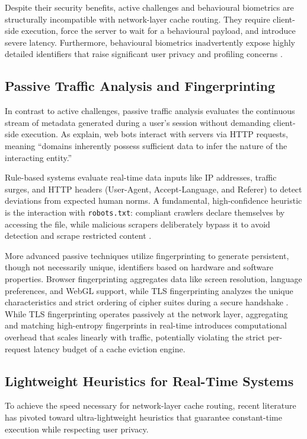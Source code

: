 Despite their security benefits, active challenges and behavioural biometrics are structurally incompatible with network-layer cache routing. They require client-side execution, force the server to wait for a behavioural payload, and introduce severe latency. Furthermore, behavioural biometrics inadvertently expose highly detailed identifiers that raise significant user privacy and profiling concerns \cite{martinez_llamas_balancing_2025}.

\subsection{Passive Traffic Analysis and Fingerprinting}
In contrast to active challenges, passive traffic analysis evaluates the continuous stream of metadata generated during a user’s session without demanding client-side execution. As  explain, web bots interact with servers via HTTP requests, meaning ``domains inherently possess sufficient data to infer the nature of the interacting entity.''

Rule-based systems evaluate real-time data inputs like IP addresses, traffic surges, and HTTP headers (User-Agent, Accept-Language, and Referer) to detect deviations from expected human norms. A fundamental, high-confidence heuristic is the interaction with \texttt{robots.txt}: compliant crawlers declare themselves by accessing the file, while malicious scrapers deliberately bypass it to avoid detection and scrape restricted content \cite{martinez_llamas_balancing_2025}.

More advanced passive techniques utilize fingerprinting to generate persistent, though not necessarily unique, identifiers based on hardware and software properties. Browser fingerprinting aggregates data like screen resolution, language preferences, and WebGL support, while TLS fingerprinting analyzes the unique characteristics and strict ordering of cipher suites during a secure handshake \cite{martinez_llamas_balancing_2025}. While TLS fingerprinting operates passively at the network layer, aggregating and matching high-entropy fingerprints in real-time introduces computational overhead that scales linearly with traffic, potentially violating the strict per-request latency budget of a cache eviction engine.

\subsection{Lightweight Heuristics for Real-Time Systems}
To achieve the speed necessary for network-layer cache routing, recent literature has pivoted toward ultra-lightweight heuristics that guarantee constant-time execution while respecting user privacy.

